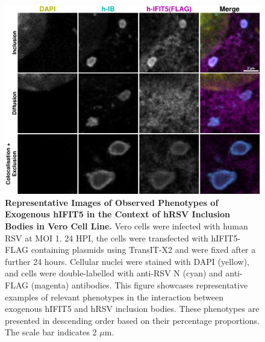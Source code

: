 \begin{figure}
    \centering
    \includegraphics[width=1\linewidth]{09. Chapter 4/Figs/02. Overexpression/04. IFIT5/03. i5-hrsv.pdf}
    \caption[Representative Images of Observed Phenotypes of Exogenous hIFIT5 in the Context of hRSV Inclusion Bodies in Vero Cell Line.]{\textbf{Representative Images of Observed Phenotypes of Exogenous hIFIT5 in the Context of hRSV Inclusion Bodies in Vero Cell Line.} Vero cells were infected with human RSV at MOI 1. 24 HPI, the cells were transfected with hIFIT5-FLAG containing plasmids using TransIT-X2 and were fixed after a further 24 hours. Cellular nuclei were stained with DAPI (yellow), and cells were double-labelled with anti-RSV N (cyan) and anti-FLAG (magenta) antibodies. This figure showcases representative examples of relevant phenotypes in the interaction between exogenous hIFIT5 and hRSV inclusion bodies. These phenotypes are presented in descending order based on their percentage proportions. The scale bar indicates 2 \(\mu \mbox{m}\).}
    \label{fig:Representative Images of Observed Phenotypes of Exogenous hIFIT5 in the Context of hRSV Inclusion Bodies in VERO Cell Line}
\end{figure}

